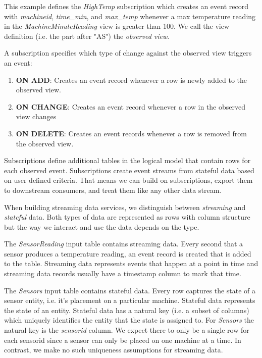 \documentclass[	DIV=calc,%
							paper=letter,%
							fontsize=11pt,%
							twocolumn]{scrartcl}	 					%
\begin{document}
This example defines the \emph{HighTemp} subscription which creates an event record with \emph{machineid}, \emph{time\_min}, and \emph{max\_temp} whenever a max temperature reading in the \emph{MachineMinuteReading} view is greater than 100. We call the view definition (i.e. the part after "AS") the \emph{observed view}.

A subscription specifies which type of change against the observed view triggers an event:
\begin{enumerate}
    \item \textbf{ON ADD}: Creates an event record whenever a row is newly added to the observed view.
    \item \textbf{ON CHANGE}: Creates an event record whenever a row in the observed view changes
    \item \textbf{ON DELETE}: Creates an event records whenever a row is removed from the observed view.
\end{enumerate}

Subscriptions define additional tables in the logical model that contain rows for each observed event. Subscriptions create event streams from stateful data based on user defined criteria. That means we can build on subscriptions, export them to downstream consumers, and treat them like any other data stream.

When building streaming data services, we distinguish between \emph{streaming} and \emph{stateful} data. Both types of data are represented as rows with column structure but the way we interact and use the data depends on the type.

The \emph{SensorReading} input table contains streaming data. Every second that a sensor produces a temperature reading, an event record is created that is added to the table. Streaming data represents events that happen at a point in time and streaming data records usually have a timestamp column to mark that time.

The \emph{Sensors} input table contains stateful data. Every row captures the state of a sensor entity, i.e. it's placement on a particular machine. Stateful data represents the state of an entity. Stateful data has a natural key (i.e. a subset of columns) which uniquely identifies the entity that the state is assigned to. For \emph{Sensors} the natural key is the \emph{sensorid} column. We expect there to only be a single row for each sensorid since a sensor can only be placed on one machine at a time. In contrast, we make no such uniqueness assumptions for streaming data.
\end{document}

